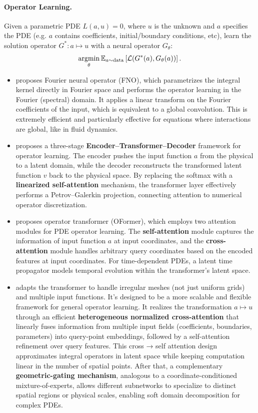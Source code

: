\documentclass[11pt]{article}
\newcommand{\bbE}{\mathbb{E}}
\begin{document}
\paragraph{Operator Learning.} Given a parametric PDE $L(a,u)=0$, where $u$ is the unknown and $a$ specifies the PDE (e.g. $a$ contains coefficients, initial/boundary conditions, etc), learn the solution operator $G^*:a\mapsto u$ with a neural operator $G_\theta$:
\begin{equation*}
    \underset{\theta}{\argmin}\,\bbE_{a\sim\mathrm{data}}\left[\mathcal{L}(G^*(a),G_\theta(a))\right].
\end{equation*}
\begin{itemize}
    \item \cite{li2020fourier} proposes Fourier neural operator (FNO), which parametrizes the integral kernel directly in Fourier space and performs the operator learning in the Fourier (spectral) domain. It applies a linear transform on the Fourier coefficients of the input, which is equivalent to a global convolution. This is extremely efficient and particularly effective for equations where interactions are global, like in fluid dynamics.
    \item \cite{cao2021choose} proposes a three-stage \textbf{Encoder–Transformer–Decoder} framework for operator learning. The encoder pushes the input function $a$ from the physical to a latent domain, while the decoder reconstructs the transformed latent function $v$ back to the physical space. By replacing the softmax with a \textbf{linearized self-attention} mechanism, the transformer layer effectively performs a Petrov–Galerkin projection, connecting attention to numerical operator discretization.
    
    \item \cite{li2022transformer} proposes operator transformer (OFormer), which employs two attention modules for PDE operator learning. The \textbf{self-attention} module captures the information of input function $a$ at input coordinates, and the \textbf{cross-attention} module handles arbitrary query coordinates based on the encoded features at input coordinates. For time-dependent PDEs, a latent time propagator models temporal evolution within the transformer's latent space.
    
    
    \item\cite{hao2023gnot} adapts the transformer to handle irregular meshes (not just uniform grids) and multiple input functions. It's designed to be a more scalable and flexible framework for general operator learning. It realizes the transformation $a\mapsto u$ through an efficient \textbf{heterogeneous normalized cross-attention} that linearly fuses information from multiple input fields (coefficients, boundaries, parameters) into query-point embeddings, followed by a self-attention refinement over query features. This cross → self attention design approximates integral operators in latent space while keeping computation linear in the number of spatial points. After that, a complementary \textbf{geometric-gating mechanism}, analogous to a coordinate-conditioned mixture-of-experts, allows different subnetworks to specialize to distinct spatial regions or physical scales, enabling soft domain decomposition for complex PDEs.
    

\end{itemize}
\end{document}
